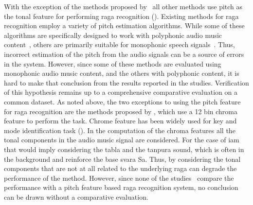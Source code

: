 With the exception of the methods proposed by~\cite{dighe2013scale,dighe2013swara} all other methods use pitch as the tonal feature for performing \gls{raga} recognition (). Existing methods for \gls{raga} recognition employ a variety of pitch estimation algorithms. While some of these algorithms are specifically designed to work with polyphonic audio music content~\cite{Salamon2012}, others are primarily suitable for monophonic speech signals~\cite{BoersmaPaul2001}. Thus, incorrect estimation of the pitch from the audio signals can be a source of errors in the system. However, since some of these methods are evaluated using monophonic audio music content, and the others with polyphonic content, it is hard to make that conclusion from the results reported in the studies. Verification of this hypothesis remains up to a comprehensive comparative evaluation on a common dataset. As noted above, the two exceptions to using the pitch feature for \gls{raga} recognition are the methods proposed by \cite{dighe2013scale,dighe2013swara}, which use a 12 bin chroma feature to perform the task. Chrome feature has been widely used for key and mode identification task (). In the computation of the chroma features all the tonal components in the audio music signal are considered. For the case of \gls{iam} that would imply considering the \gls{tabla} and the \gls{tanpura} sound, which is often in the background and reinforce the base \gls{svara} Sa. Thus, by considering the tonal components that are not at all related to the underlying \gls{raga} can degrade the performance of the method. However, since none of the studies~\citep{dighe2013scale,dighe2013swara} compare the performance with a pitch feature based \gls{raga} recognition system, no conclusion can be drawn without a comparative evaluation.

